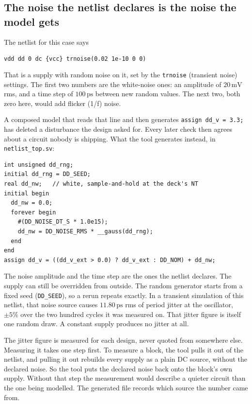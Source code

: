 \documentclass[11pt,a4paper]{article}
\newcommand{\unit}[1]{\,\textrm{#1}}
\begin{document}
\subsection{The noise the netlist declares is the noise the model gets}
\label{sec:noise}

The netlist for this case says

\begin{center}
\texttt{vdd dd 0 dc \{vcc\} trnoise(0.02 1e-10 0 0)}
\end{center}

\noindent That is a supply with random noise on it, set by the
\texttt{trnoise} (transient noise) settings. The first two numbers are
the white-noise ones: an amplitude of $20\unit{mV}$ rms, and a time
step of $100\unit{ps}$ between new random values. The next two, both
zero here, would add flicker (1/f) noise.

A composed model that reads that line and then generates
\texttt{assign dd\_v = 3.3;} has deleted a disturbance the design
asked for. Every later check then agrees about a circuit nobody is
shipping. What the tool generates instead, in
\texttt{netlist\_top.sv}:

\begin{lstlisting}
int unsigned dd_rng;
initial dd_rng = DD_SEED;
real dd_nw;   // white, sample-and-hold at the deck's NT
initial begin
  dd_nw = 0.0;
  forever begin
    #(DD_NOISE_DT_S * 1.0e15);
    dd_nw = DD_NOISE_RMS * __gauss(dd_rng);
  end
end
assign dd_v = ((dd_v_ext > 0.0) ? dd_v_ext : DD_NOM) + dd_nw;
\end{lstlisting}

\noindent The noise amplitude and the time step are the ones the
netlist declares. The supply can still be overridden from outside. The
random generator starts from a fixed seed (\texttt{DD\_SEED}), so a
rerun repeats exactly. In a transient simulation of this netlist, that
noise source causes $11.80\unit{ps}$ rms of period jitter at the
oscillator, $\pm 5\%$ over the two hundred cycles it was measured on.
That jitter figure is itself one random draw. A constant supply
produces no jitter at all.

The jitter figure is measured for each design, never quoted from
somewhere else. Measuring it takes one step first. To measure a
block, the tool pulls it out of the netlist, and pulling it out
rebuilds every supply as a plain DC source, without the declared
noise. So the tool puts the declared noise back onto the block's own
supply. Without that step the measurement would describe a quieter
circuit than the one being modelled. The generated file records which
source the number came from.
\end{document}
